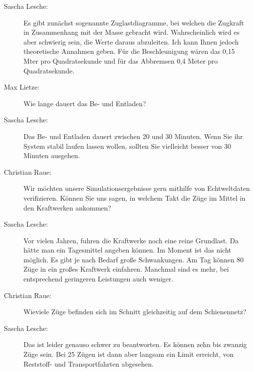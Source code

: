 \begin{description}
    \item[Sascha Lesche:] Es gibt zunächst sogenannte Zuglastdiagramme, bei welchen die Zugkraft in Zusammenhang mit der Masse gebracht wird. Wahrscheinlich wird es aber schwierig sein, die Werte daraus abzuleiten. Ich kann Ihnen jedoch theoretische Annahmen geben. Für die Beschleunigung wären das 0,15 Mter pro Quadratsekunde und für das Abbremsen 0,4 Meter pro Quadratsekunde.

    \item[Max Lietze:] Wie lange dauert das Be- und Entladen?

    \item[Sascha Lesche:] Das Be- und Entladen dauert zwischen 20 und 30 Minuten. Wenn Sie ihr System stabil laufen lassen wollen, sollten Sie vielleicht besser von 30 Minuten ausgehen.

    \item[Christian Raue:] Wir möchten unsere Simulationsergebnisse gern mithilfe von Echtweltdaten verifizieren. Können Sie uns sagen, in welchem Takt die Züge im Mittel in den Kraftwerken ankommen?

    \item[Sascha Lesche:] Vor vielen Jahren, fuhren die Kraftwerke noch eine reine Grundlast. Da hätte man ein Tagesmittel angeben können. Im Moment ist das nicht möglich. Es gibt je nach Bedarf große Schwankungen. Am Tag können 80 Züge in ein großes Kraftwerk einfahren. Manchmal sind es mehr, bei entsprechend geringeren Leistungen auch weniger.

    \item[Christian Raue:] Wieviele Züge befinden sich im Schnitt gleichzeitig auf dem Schienennetz?

    \item[Sascha Lesche:] Das ist leider genauso schwer zu beantworten. Es können zehn bis zwanzig Züge sein. Bei 25 Zügen ist dann aber langsam ein Limit erreicht, von Reststoff- und Transportfahrten abgesehen.

\end{description}